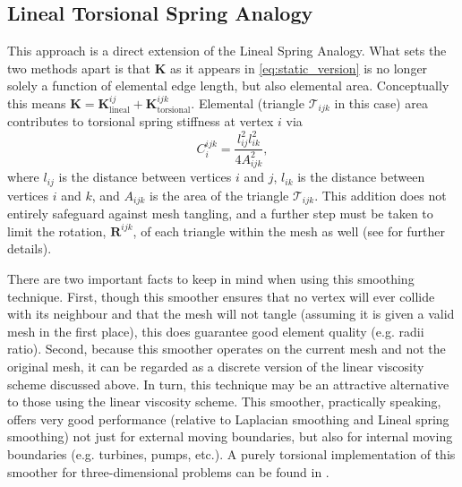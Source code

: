 \subsection{Lineal Torsional Spring Analogy}
This approach \citep{farhat1998} is a direct extension of the Lineal Spring Analogy.  What sets the two methods apart is that $\bm{K}$ as it appears in \ref{eq:static_version} is no longer solely a function of elemental edge length, but also elemental area.  Conceptually this means $\bm{K} = \bm{K}^{ij}_{\textrm{lineal}} + \bm{K}^{ijk}_{\textrm{torsional}}$.  Elemental (triangle $\mathcal{T}_{ijk}$ in this case) area contributes to torsional spring stiffness at vertex $i$ via 
\begin{equation}
\label{eq:torsional_stiffness}
C^{ijk}_{i} = \frac{l^{2}_{ij}l^{2}_{ik}}{4A^{2}_{ijk}},
\end{equation}
where $l_{ij}$ is the distance between vertices $i$ and $j$, $l_{ik}$ is the distance between vertices $i$ and $k$, and $A_{ijk}$ is the area of the triangle $\mathcal{T}_{ijk}$.  This addition does not entirely safeguard against mesh tangling, and a further step must be taken to limit the rotation, $\bm{R}^{ijk}$, of each triangle within the mesh as well (see \citep{farhat1998} for further details).  

There are two important facts to keep in mind when using this smoothing technique.  First, though this smoother ensures that no vertex will ever collide with its neighbour and that the mesh will not tangle (assuming it is given a valid mesh in the first place), this does guarantee good element quality (e.g. radii ratio).  Second, because this smoother operates on the current mesh and not the original mesh, it can be regarded as a discrete version of the linear viscosity scheme discussed above.  In turn, this technique may be an attractive alternative to those using the linear viscosity scheme.  This smoother, practically speaking, offers very good performance (relative to Laplacian smoothing and Lineal spring smoothing) not just for external moving boundaries, but also for internal moving boundaries (e.g. turbines, pumps, etc.).  A purely torsional implementation of this smoother for three-dimensional problems can be found in \citep{degand}.


